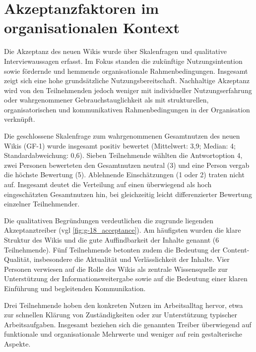 \section{Akzeptanzfaktoren im organisationalen Kontext}
\label{sec:05-05_acceptance-factors}

Die Akzeptanz des neuen Wikis wurde über Skalenfragen und qualitative Interviewaussagen erfasst. Im Fokus standen die zukünftige Nutzungsintention sowie fördernde und hemmende organisationale Rahmenbedingungen. Insgesamt zeigt sich eine hohe grundsätzliche Nutzungsbereitschaft. Nachhaltige Akzeptanz wird von den Teilnehmenden jedoch weniger mit individueller Nutzungserfahrung oder wahrgenommener Gebrauchstauglichkeit als mit strukturellen, organisatorischen und kommunikativen Rahmenbedingungen in der Organisation verknüpft.

Die geschlossene Skalenfrage zum wahrgenommenen Gesamtnutzen des neuen Wikis (GF-1) wurde insgesamt positiv bewertet (Mittelwert: 3{,}9; Median: 4; Standardabweichung: 0{,}6). Sieben Teilnehmende wählten die Antwortoption 4, zwei Personen bewerteten den Gesamtnutzen neutral (3) und eine Person vergab die höchste Bewertung (5). Ablehnende Einschätzungen (1 oder 2) traten nicht auf. Insgesamt deutet die Verteilung auf einen überwiegend als hoch eingeschätzten Gesamtnutzen hin, bei gleichzeitig leicht differenzierter Bewertung einzelner Teilnehmender.

Die qualitativen Begründungen verdeutlichen die zugrunde liegenden Akzeptanztreiber
(\acrshort{vgl} \autoref{fig:g-18_acceptance}).
Am häufigsten wurden die klare Struktur des Wikis und die gute Auffindbarkeit der Inhalte genannt (6 Teilnehmende).
Fünf Teilnehmende betonten zudem die Bedeutung der Content-Qualität, insbesondere die Aktualität und Verlässlichkeit der Inhalte.
Vier Personen verwiesen auf die Rolle des Wikis als zentrale Wissensquelle zur Unterstützung der Informationsweitergabe sowie auf die Bedeutung einer klaren Einführung und begleitenden Kommunikation.

Drei Teilnehmende hoben den konkreten Nutzen im Arbeitsalltag hervor, etwa zur schnellen Klärung von Zuständigkeiten oder zur Unterstützung typischer Arbeitsaufgaben.
Insgesamt beziehen sich die genannten Treiber überwiegend auf funktionale und organisationale Mehrwerte und weniger auf rein gestalterische Aspekte.


